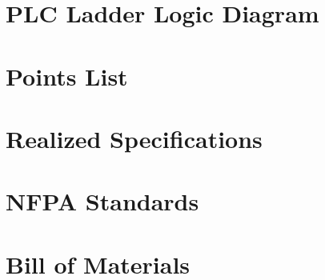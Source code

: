 \documentclass[hidelinks, 12pt]{article} %
\begin{document}
\newpage
\section{PLC Ladder Logic Diagram}
\label{sec:plc}

\pagebreak
\newpage
\section{Points List}
\label{sec:pl}

\pagebreak

\newpage
\section{Realized Specifications}
\label{sec:specs}

\pagebreak

\newpage
\section{NFPA Standards}
\label{sec:nfpa_standards}

\pagebreak

\newpage
\section{Bill of Materials}
\label{sec:bom}

\pagebreak

%
% 
\end{document}
